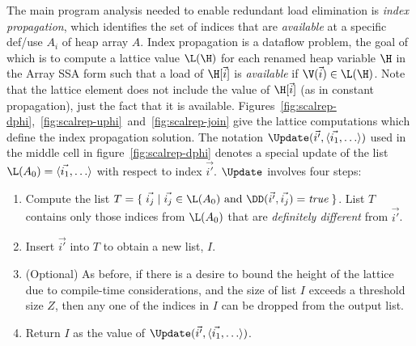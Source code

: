 The main program analysis needed to enable redundant load elimination
is {\it index propagation},
which identifies the set of indices that
are {\em available} at a specific def/use  $A_i$ of heap array $A$.
Index propagation is a dataflow problem, the goal of which is to compute a lattice value
$\L(\H)$ for each renamed heap variable $\H$ in the Array SSA form such that a load of $\H[\vec{i}]$ is {\em available}
if $\V(\vec{i}) \in \L(\H)$.  Note that the lattice element does not include the value of $\H[\vec{i}]$ (as in constant propagation), just the fact that it is available.
Figures~\ref{fig:scalrep-dphi},~\ref{fig:scalrep-uphi}~and~\ref{fig:scalrep-join} give the lattice computations which define the index propagation solution.
The notation 
$\Update(\vec{i'},\langle \vec{i_1}, \ldots \rangle)$
used in the middle cell in 
figure~\ref{fig:scalrep-dphi} denotes a special update of 
the list $\L(A_0) = \langle \vec{i_1}, \ldots \rangle$
with respect to index $\vec{i'}$.
$\Update$ involves four steps:
\begin{enumerate}
\item Compute the list $T = \{\;\vec{i_j}\;|\;\vec{i_j}\in\L(A_0)
\mbox{~and~}\DD(\vec{i'},\vec{i_j})=\mbox{\it true}\;\}$.  List $T$
contains only those indices from $\L(A_0)$ that are
{\it definitely different} from $\vec{i'}$.

\item Insert $\vec{i'}$ into $T$ to obtain a new list, $I$.
\item (Optional) As before, if there is a desire to bound the height of the lattice due to
  compile-time considerations, and the
  size of list
$I$ exceeds a threshold size $Z$, then any one of the indices in $I$ can
be 
dropped from the output list.
\item Return $I$ as the value of 
$\Update(\vec{i'},\langle \vec{i_1}, \ldots \rangle)$.
\end{enumerate}


